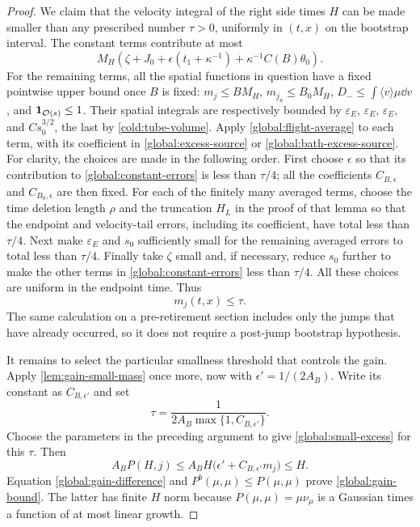 \begin{proof}
We claim that the velocity integral of the right side times $H$ can
be made smaller than any prescribed number $\tau>0$, uniformly in
$(t,x)$ on the bootstrap interval.  The constant terms contribute at
most
\begin{equation}\label{global:constant-errors}
 M_H\left(\zeta+J_0+\epsilon(t_1+\kappa^{-1})
                      +\kappa^{-1}C(B)\theta_0\right).
\end{equation}
For the remaining terms, all the spatial functions in question have
a fixed pointwise upper bound once $B$ is fixed:
$m_j\le BM_H$, $m_{j_u}\le B_0M_H$,
$D_-\le\int\langle v\rangle\mu\dd v$, and
$\mathbf 1_{\mathcal O(s)}\le1$.  Their spatial integrals are respectively
bounded by $\varepsilon_E$, $\varepsilon_E$, $\varepsilon_E$, and
$Cs_0^{3/2}$, the last by \eqref{cold:tube-volume}.
Apply \cref{global:flight-average} to each term, with its coefficient
in \eqref{global:excess-source} or \eqref{global:bath-excess-source}.
For clarity, the choices are made in the following order.  First choose
$\epsilon$ so that its contribution to \eqref{global:constant-errors}
is less than $\tau/4$; all the coefficients $C_{B,\epsilon}$ and
$C_{B_0,\epsilon}$ are then fixed.  For each of the finitely many
averaged terms, choose the time deletion length $\rho$ and the
truncation $H_L$ in the proof of that lemma so that the endpoint and
velocity-tail errors, including its coefficient, have total less than
$\tau/4$.  Next make $\varepsilon_E$ and $s_0$ sufficiently small for
the remaining averaged errors to total less than $\tau/4$.  Finally
take $\zeta$ small and, if necessary, reduce $s_0$ further to make the
other terms in \eqref{global:constant-errors} less than $\tau/4$.
All these choices are uniform in the endpoint time.  Thus
\begin{equation}\label{global:small-excess}
 m_j(t,x)\le\tau.
\end{equation}
The same calculation on a pre-retirement section includes only the
jumps that have already occurred, so it does not require a post-jump
bootstrap hypothesis.

It remains to select the particular smallness threshold that controls
the gain.  Apply \cref{lem:gain-small-mass} once more, now with
$\epsilon'=1/(2A_B)$.  Write its constant as $C_{B,\epsilon'}$ and set
\[
 \tau=\frac{1}{2A_B\max\{1,C_{B,\epsilon'}\}}.
\]
Choose the parameters in the preceding argument to give
\eqref{global:small-excess} for this $\tau$.  Then
\[
 A_BP(H,j)\le
 A_BH\bigl(\epsilon'+C_{B,\epsilon'}m_j\bigr)\le H.
\]
Equation \eqref{global:gain-difference} and $P^b(\mu,\mu)\le
P(\mu,\mu)$ prove \eqref{global:gain-bound}.  The latter has finite
$H$ norm because $P(\mu,\mu)=\mu\nu_\mu$ is a Gaussian times a function
of at most linear growth.
\end{proof}

